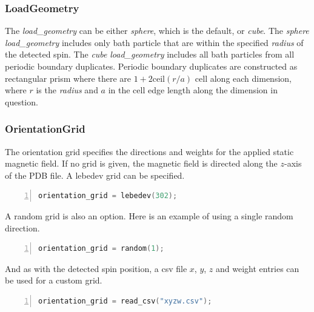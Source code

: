 \documentclass{book}
\begin{document}
\subsubsection{LoadGeometry} %
The \textit{load\_geometry} can be either \textit{sphere}, 
which is the default, or \textit{cube}.  The \textit{sphere} 
\textit{load\_geometry} includes only bath particle that are within the
specified \textit{radius} of the detected spin.  The \textit{cube} 
\textit{load\_geometry} includes all bath particles from all periodic 
boundary duplicates.  
Periodic boundary duplicates are constructed as rectangular prism where there
are $1 + 2\text{ceil}(r/a)$ cell along each dimension, 
where $r$ is the \textit{radius} and $a$ in the cell edge length along the
dimension in question. 

\subsubsection{OrientationGrid} %
The orientation grid specifies the directions and weights for the applied 
static magnetic field.  If no grid is given, the magnetic field is directed 
along the $z$-axis of the PDB file.
A lebedev grid \cite{1999_Lebedev} can be specified.
\begin{lstlisting}[frame=single,numbers=left,language=c]
orientation_grid = lebedev(302);
\end{lstlisting}
A random grid is also an option.  Here is an example of using a single random
direction. 
\begin{lstlisting}[frame=single,numbers=left,language=c]
orientation_grid = random(1);
\end{lstlisting}
And as with the detected spin position, a csv file $x$, $y$, $z$ and weight
entries can be used for a custom grid.
\begin{lstlisting}[frame=single,numbers=left,language=c]
orientation_grid = read_csv("xyzw.csv");
\end{lstlisting}
\end{document}
